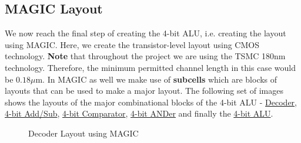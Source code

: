 \documentclass[a4paper, titlepage]{article}
\begin{document}
\subsection{MAGIC Layout}
We now reach the final step of creating the 4-bit ALU, i.e. creating the layout using MAGIC. Here, we create the
transistor-level layout using CMOS technology. \textbf{Note} that throughout the project we are using the TSMC 180nm
technology. Therefore, the minimum permitted channel length in this case would be $0.18\mu$m. In MAGIC as well we 
make use of \textbf{subcells} which are blocks of layouts that can be used to make a major layout.
The following set of images shows the layouts of
the major combinational blocks of the 4-bit ALU - \hyperlink{4DM}{Decoder}, \hyperlink{4ASM}{4-bit Add/Sub}, 
\hyperlink{4CM}{4-bit Comparator}, \hyperlink{4AM}{4-bit ANDer} and finally the \hyperlink{4ALUM}{4-bit ALU}.
\begin{figure}[htp]
    \centering
    \hypertarget{4DM}{}
    \caption{Decoder Layout using MAGIC}
    \label{fig:fig5}
\end{figure}
\end{document}
